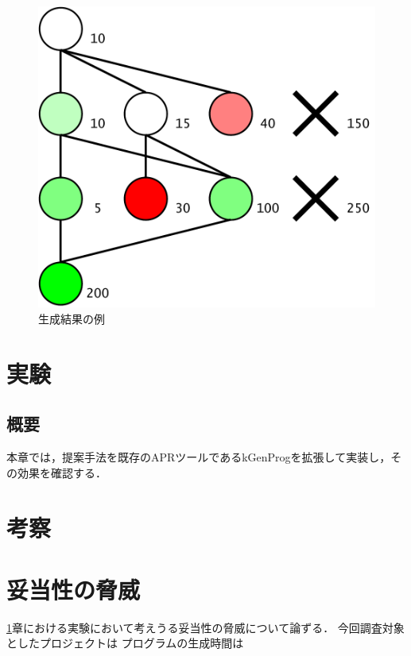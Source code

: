 \documentclass[uplatex,dvipdfmx,a4paper]{jsarticle}
\let\oldcite\cite
\renewcommand{\cite}[1]{\xspace\oldcite{#1}}
\begin{document}
\begin{figure}[t]
  \centering
  \includegraphics[width=\linewidth]{fig/astSample.pdf}
  \caption{生成結果の例}
  \label{fig:example}
\end{figure}

\clearpage
\section{実験} \label{sec:exp}
\subsection{概要}
本章では，提案手法を既存のAPRツールであるkGenProg\cite{higo2018kgenprog}を拡張して実装し，その効果を確認する．

\clearpage
\section{考察}



\clearpage
\section{妥当性の脅威}
\ref{sec:exp}章における実験において考えうる妥当性の脅威について論ずる．
今回調査対象としたプロジェクトは
プログラムの生成時間は
\end{document}
